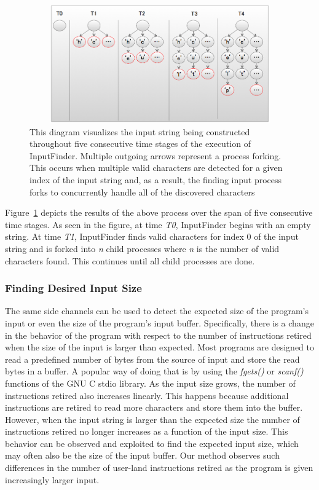 \documentclass{acm_proc_article-sp}
\def \tool {InputFinder}
\begin{document}
\begin{figure}[t]
\centering
\includegraphics[height=2in,width=6.5in]{string_builder.png}
\caption{This diagram visualizes the input string being constructed throughout five consecutive time stages of the execution of 
\tool{}. Multiple outgoing arrows represent a process forking. This occurs when multiple valid characters are detected for a given index of the input string and, as a result, the finding input process forks to concurrently handle all of the discovered characters}
\label{fig:string_builder}
\end{figure}

Figure~\ref{fig:string_builder} depicts the results of the above process over the span of five consecutive time stages.
As seen in the figure, at time \textit{T0}, \tool{} begins with an empty string.
At time \textit{T1}, \tool{} finds valid characters for index 0 of the input string and is forked into \textit{n} child processes where \textit{n} is the number of valid characters found.
This continues until all child processes are done.

\subsubsection{Finding Desired Input Size}
The same side channels can be used to detect the expected size of the program's input or even the size of the program's input buffer.
Specifically, there is a change in the behavior of the program with respect to the number of instructions retired when the size of the input is larger than expected.
Most programs are designed to read a predefined number of bytes from the source of input and store the read bytes in a buffer.
A popular way of doing that is by using the \textit{fgets()} or \textit{scanf()} functions of the GNU C stdio library.
As the input size grows, the number of instructions retired also increases linearly.
This happens because additional instructions are retired to read more characters and store them into the buffer.
However, when the input string is larger than the expected size the number of instructions retired no longer increases as a function of the input size.
This behavior can be observed and exploited to find the expected input size, which may often also be the size of the input buffer.
Our method observes such differences in the number of user-land instructions retired as the program is given increasingly larger input.
\end{document}
